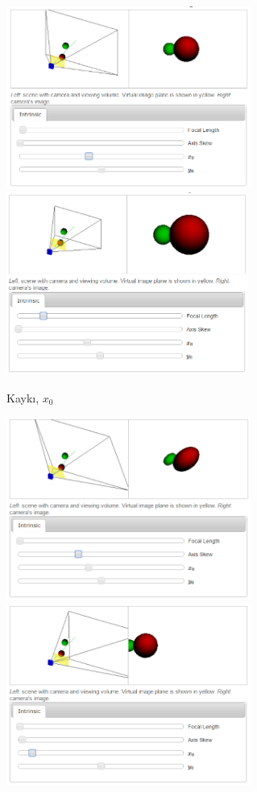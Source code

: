 \documentclass[12pt,fleqn]{article}\usepackage{../../common}
\begin{document}
\includegraphics[height=6cm]{05_01.png}
\includegraphics[height=6cm]{05_02.png}

Kaykı, $x_0$

\includegraphics[height=6cm]{05_03.png}
\includegraphics[height=6cm]{05_04.png}
\end{document}
